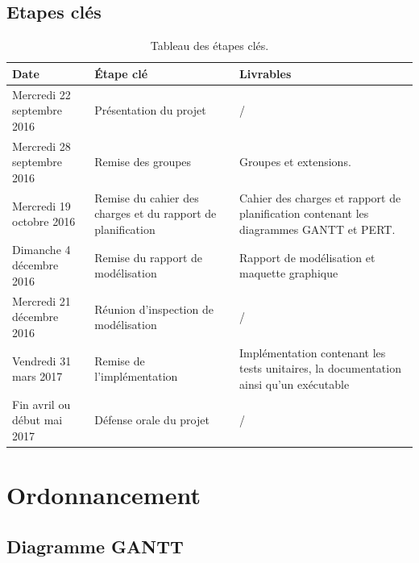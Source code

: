 \documentclass[]{article}
\newcommand{\placeholder}[1]{{\noindent \color{red}[ #1 ]}}
\begin{document}
\subsection{Etapes clés }

\begin{table}[htbp]
\begin{center}
\begin{tabular}{p{3cm}|p{6cm}|p{6cm}}
	Date & Étape clé & Livrables\\
	\hline
	Mercredi 22 septembre 2016 & Présentation du projet & /\\
	\hline
	Mercredi 28 septembre 2016 & Remise des groupes & Groupes et extensions.\\
	\hline
	Mercredi 19 octobre 2016 & Remise du cahier des charges et du rapport de planification & Cahier des charges et rapport de planification contenant les diagrammes GANTT et PERT.\\
	\hline
	Dimanche 4 décembre 2016 & Remise du rapport de modélisation & Rapport de modélisation et maquette graphique\\
	\hline
	Mercredi 21 décembre 2016 & Réunion d’inspection de modélisation & /\\
	\hline
	Vendredi 31 mars 2017 & Remise de l'implémentation & Implémentation contenant les tests unitaires, la documentation ainsi qu'un exécutable\\
	\hline
	Fin avril ou début mai 2017 & Défense orale du projet & /\\
\end{tabular}
\end{center}
   \caption{Tableau des étapes clés.}
   \label{tab:TEC}
\end{table}

\newpage

\section{Ordonnancement}

\subsection{Diagramme GANTT}

%
\end{document}

